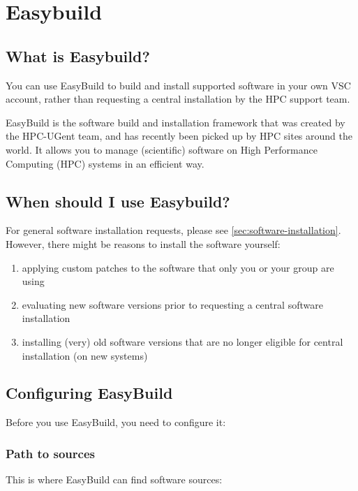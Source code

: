 \chapter{Easybuild}
\label{ch:easybuild}

\section{What is Easybuild?}

You can use EasyBuild to build and install supported software in your own VSC account,
rather than requesting a central installation by the HPC support team.

EasyBuild is the software build and installation framework that was created by the HPC-UGent
team, and has recently been picked up by HPC sites around the world. It allows you to manage
(scientific) software on High Performance Computing (HPC) systems in an efficient way.

\section{When should I use Easybuild?}

For general software installation requests, please see \autoref{sec:software-installation}. However,
there might be reasons to install the software yourself:

\begin{enumerate}
    \item applying custom patches to the software that only you or your group are using
    \item evaluating new software versions prior to requesting a central software installation
    \item installing (very) old software versions that are no longer eligible for central installation (on new systems)
\end{enumerate}

\section{Configuring EasyBuild}

Before you use EasyBuild, you need to configure it:

\subsection{Path to sources}

This is where EasyBuild can find software sources:

